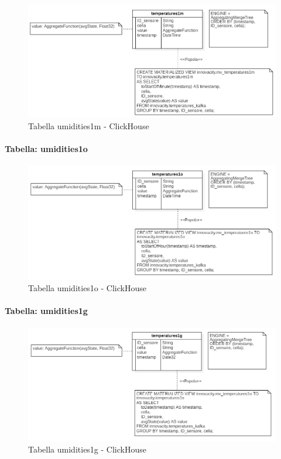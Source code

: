     \begin{figure}[H]
        \centering
        \includegraphics[width=1\textwidth]{../Images/SpecificaTecnica/temperatures1m.PNG}
        \caption{Tabella  umidities1m - ClickHouse}

        \label{fig: umidities1m}
      \end{figure}
      \paragraph{Tabella:  umidities1o}
      \begin{figure}[H]
          \centering
          \includegraphics[width=1\textwidth]{../Images/SpecificaTecnica/temperatures1o.PNG}
          \caption{Tabella  umidities1o - ClickHouse}
          \label{fig: umidities1o}
        \end{figure}
    \paragraph{Tabella:  umidities1g}
    \begin{figure}[H]
        \centering
        \includegraphics[width=1\textwidth]{../Images/SpecificaTecnica/temperatures1g.PNG}
        \caption{Tabella  umidities1g - ClickHouse}
        \label{fig: umidities1g}
        \end{figure}
